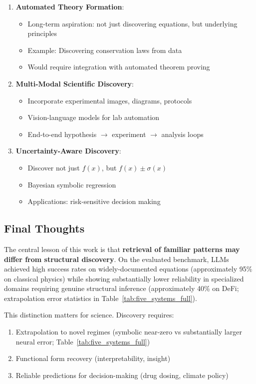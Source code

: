 \documentclass[11pt,a4paper]{article}
\begin{document}
\begin{enumerate}
\item \textbf{Automated Theory Formation}:
   \begin{itemize}
   \item Long-term aspiration: not just discovering equations, but underlying principles
   \item Example: Discovering conservation laws from data
   \item Would require integration with automated theorem proving
   \end{itemize}

\item \textbf{Multi-Modal Scientific Discovery}:
   \begin{itemize}
   \item Incorporate experimental images, diagrams, protocols
   \item Vision-language models for lab automation
   \item End-to-end hypothesis $\to$ experiment $\to$ analysis loops
   \end{itemize}

\item \textbf{Uncertainty-Aware Discovery}:
   \begin{itemize}
   \item Discover not just $f(x)$, but $f(x) \pm \sigma(x)$
   \item Bayesian symbolic regression
   \item Applications: risk-sensitive decision making
   \end{itemize}
\end{enumerate}

\subsection{Final Thoughts}

The central lesson of this work is that \textbf{retrieval of familiar patterns may differ from structural discovery}\citep{kambhampati2024llms}. On the evaluated benchmark, LLMs achieved high success rates on widely-documented equations (approximately 95\% on classical physics) while showing substantially lower reliability in specialized domains requiring genuine structural inference (approximately 40\% on DeFi; extrapolation error statistics in Table~\ref{tab:five_systems_full}).

This distinction matters for science. Discovery requires:
\begin{enumerate}
\item Extrapolation to novel regimes (symbolic near-zero vs substantially larger neural error; Table~\ref{tab:five_systems_full})
\item Functional form recovery (interpretability, insight)
\item Reliable predictions for decision-making (drug dosing, climate policy)
\end{enumerate}
\end{document}

